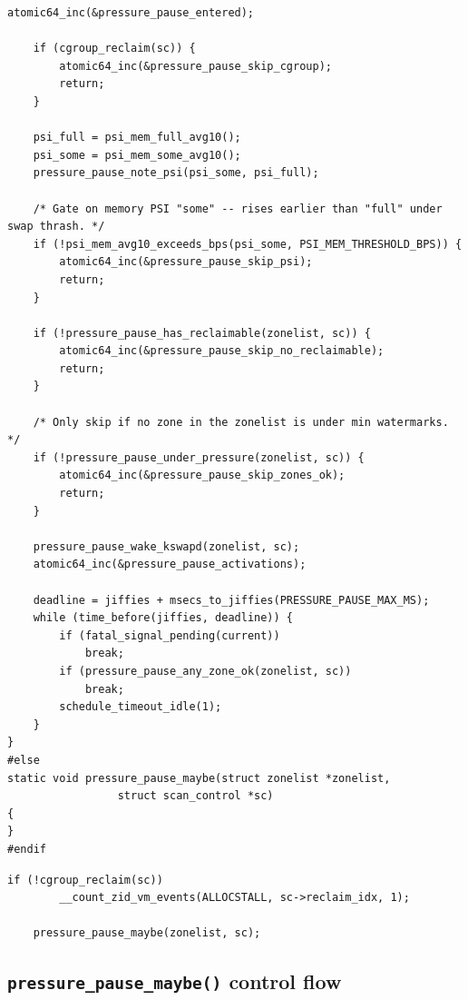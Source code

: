 \documentclass[12pt,a4paper]{article}
\begin{document}
\begin{codebox}
\begin{lstlisting}[style=cstyle]
	atomic64_inc(&pressure_pause_entered);

	if (cgroup_reclaim(sc)) {
		atomic64_inc(&pressure_pause_skip_cgroup);
		return;
	}

	psi_full = psi_mem_full_avg10();
	psi_some = psi_mem_some_avg10();
	pressure_pause_note_psi(psi_some, psi_full);

	/* Gate on memory PSI "some" -- rises earlier than "full" under swap thrash. */
	if (!psi_mem_avg10_exceeds_bps(psi_some, PSI_MEM_THRESHOLD_BPS)) {
		atomic64_inc(&pressure_pause_skip_psi);
		return;
	}

	if (!pressure_pause_has_reclaimable(zonelist, sc)) {
		atomic64_inc(&pressure_pause_skip_no_reclaimable);
		return;
	}

	/* Only skip if no zone in the zonelist is under min watermarks. */
	if (!pressure_pause_under_pressure(zonelist, sc)) {
		atomic64_inc(&pressure_pause_skip_zones_ok);
		return;
	}

	pressure_pause_wake_kswapd(zonelist, sc);
	atomic64_inc(&pressure_pause_activations);

	deadline = jiffies + msecs_to_jiffies(PRESSURE_PAUSE_MAX_MS);
	while (time_before(jiffies, deadline)) {
		if (fatal_signal_pending(current))
			break;
		if (pressure_pause_any_zone_ok(zonelist, sc))
			break;
		schedule_timeout_idle(1);
	}
}
#else
static void pressure_pause_maybe(struct zonelist *zonelist,
				 struct scan_control *sc)
{
}
#endif
\end{lstlisting}
\end{codebox}

\begin{codebox}
\begin{lstlisting}[style=cstyle]
	if (!cgroup_reclaim(sc))
		__count_zid_vm_events(ALLOCSTALL, sc->reclaim_idx, 1);

	pressure_pause_maybe(zonelist, sc);
\end{lstlisting}
\end{codebox}

\subsection{\texttt{pressure\_pause\_maybe()} control flow}
\end{document}
